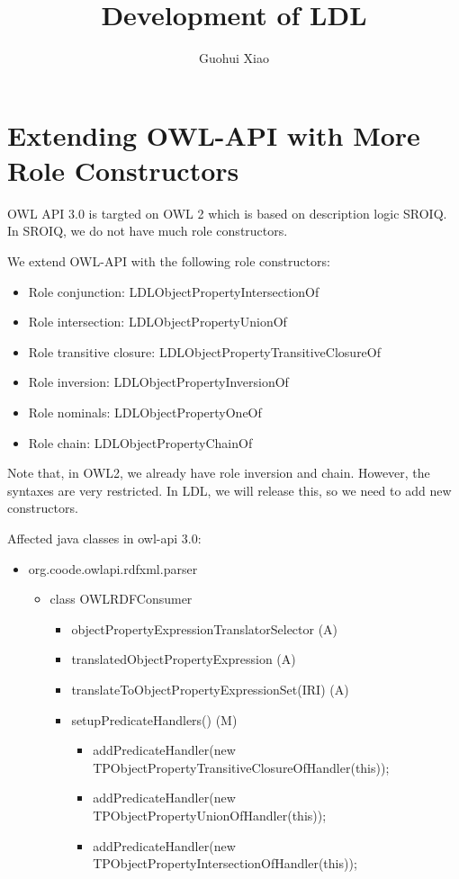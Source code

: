 \documentclass{article}
\begin{document}
	\title{Development of LDL}
	\author{Guohui Xiao}
	\maketitle
	
	\section{Extending OWL-API with More Role Constructors}
	
	OWL API 3.0 is targted on OWL 2 which is based on description logic SROIQ. 
	In SROIQ, we do not have much role constructors.
	
	We extend OWL-API with the following role constructors:
	
	\begin{itemize}
    \item Role conjunction: LDLObjectPropertyIntersectionOf
    \item Role intersection: LDLObjectPropertyUnionOf
    \item Role transitive closure: LDLObjectPropertyTransitiveClosureOf
    \item Role inversion: LDLObjectPropertyInversionOf
    \item Role nominals: LDLObjectPropertyOneOf
    \item Role chain: LDLObjectPropertyChainOf
    \end{itemize}
	
	Note that, in OWL2, we already have role inversion and chain. 
	However, the syntaxes are very restricted. 
	In LDL, we will release this, so we need to add new constructors.
	
	Affected java classes in owl-api 3.0:
	
	\begin{itemize}
      \item org.coode.owlapi.rdfxml.parser
      \begin{itemize}
        \item class OWLRDFConsumer 
        	\begin{itemize}
        	\item objectPropertyExpressionTranslatorSelector (A)
        	\item translatedObjectPropertyExpression (A)
        	\item translateToObjectPropertyExpressionSet(IRI) (A)
        	\item setupPredicateHandlers() (M)
        	\begin{itemize}
             \item  addPredicateHandler(new TPObjectPropertyTransitiveClosureOfHandler(this));
        	\item addPredicateHandler(new TPObjectPropertyUnionOfHandler(this));
        	\item addPredicateHandler(new TPObjectPropertyIntersectionOfHandler(this));
        
              \end{itemize}
        \end{itemize}
      \end{itemize}
    \end{itemize}
	
	\section{}
	
	
\end{document}
